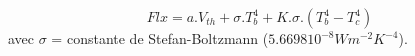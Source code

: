 \[
Flx =  a.V_{th} + \sigma.T_b^4 + K.\sigma.(T_b^4 - T_c^4)
\]
avec $\sigma$ = constante de Stefan-Boltzmann ($5.6698 10^{-8} W m^{-2} K^{-4}$).

